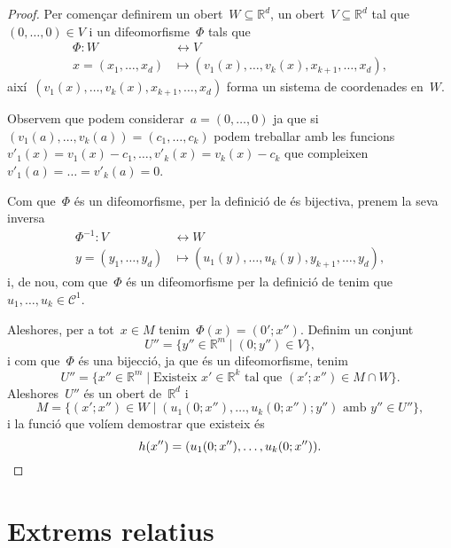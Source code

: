 \documentclass[../calcul-en-diverses-variables.tex]{subfiles}
\begin{document}
    \begin{proof}%
        Per començar definirem un obert~\(W\subseteq\mathbb{R}^{d}\), un obert~\(V\subseteq\mathbb{R}^{d}\) tal que~\((0,\dots,0)\in V\) i un difeomorfisme~\(\Phi\) tals que
        \begin{align*}
        \Phi\colon W&\longleftrightarrow V\\
        x=(x_{1},\dots,x_{d})&\longmapsto(v_{1}(x),\dots,v_{k}(x),x_{k+1},\dots,x_{d}),
        \end{align*}
        així~\((v_{1}(x),\dots,v_{k}(x),x_{k+1},\dots,x_{d})\) forma un sistema de coordenades en~\(W\).

        Observem que podem considerar~\(a=(0,\dots,0)\) ja que si~\((v_{1}(a),\dots,v_{k}(a))=(c_{1},\dots,c_{k})\) podem treballar amb les funcions~\(v'_{1}(x)=v_{1}(x)-c_{1},\dots,v'_{k}(x)=v_{k}(x)-c_{k}\) que compleixen~\(v'_{1}(a)=\dots=v'_{k}(a)=0\).

        Com que~\(\Phi\) és un difeomorfisme, per la definició de  és bijectiva, prenem la seva inversa
        \begin{align*}
        \Phi^{-1}\colon V&\longleftrightarrow W\\
        y=(y_{1},\dots,y_{d})&\longmapsto(u_{1}(y),\dots,u_{k}(y),y_{k+1},\dots,y_{d}),
        \end{align*}
        i, de nou, com que~\(\Phi\) és un difeomorfisme per la definició de  tenim que~\(u_{1},\dots,u_{k}\in\mathcal{C}^{1}\).

        Aleshores, per a tot~\(x\in M\) tenim~\(\Phi(x)=(0';x'')\).
        Definim un conjunt
        \[
            U''=\{y''\in\mathbb{R}^{m}\mid(0;y'')\in V\},
        \]
        i com que~\(\Phi\) és una bijecció, ja que és un difeomorfisme, tenim
        \[
            U''=\{x''\in\mathbb{R}^{m}\mid\text{Existeix }x'\in\mathbb{R}^{k}\text{ tal que }(x';x'')\in M\cap W\}.
        \]
        Aleshores~\(U''\) és un obert de~\(\mathbb{R}^{d}\) i %
        \[
            M=\{(x';x'')\in W\mid(u_{1}(0;x''),\dots,u_{k}(0;x'');y'')\text{ amb }y''\in U''\},
        \] %
        i la funció que volíem demostrar que existeix és
        \[
            h(x'')=(u_{1}(0;x''),\dots,u_{k}(0;x'')).\qedhere
        \]
    \end{proof}
\section{Extrems relatius}
\end{document}
